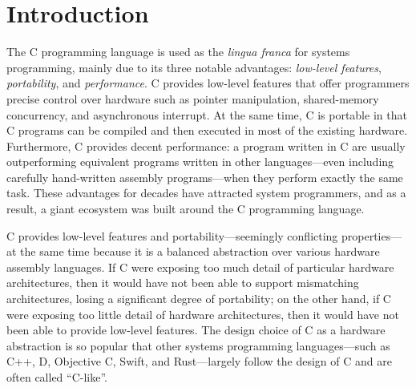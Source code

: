 \section{Introduction}
\label{sec:introduction}

The C programming language is used as the \emph{lingua franca} for systems programming, mainly due
to its three notable advantages: \emph{low-level features}, \emph{portability}, and
\emph{performance}.  C provides low-level features that offer programmers precise control over
hardware such as pointer manipulation, shared-memory concurrency, and asynchronous interrupt.  At
the same time, C is portable in that C programs can be compiled and then executed in most of the
existing hardware.  Furthermore, C provides decent performance: a program written in C are usually
outperforming equivalent programs written in other languages---even including carefully hand-written
assembly programs---when they perform exactly the same task.  These advantages for decades have
attracted system programmers, and as a result, a giant ecosystem was built around the C programming
language.

C provides low-level features and portability---seemingly conflicting properties---at the same time
because it is a balanced abstraction over various hardware assembly languages.  If C were exposing
too much detail of particular hardware architectures, then it would have not been able to support
mismatching architectures, losing a significant degree of portability; on the other hand, if C were
exposing too little detail of hardware architectures, then it would have not been able to provide
low-level features.  The design choice of C as a hardware abstraction is so popular that other
systems programming languages---such as C++, D, Objective C, Swift, and Rust---largely follow the
design of C and are often called ``C-like''.





